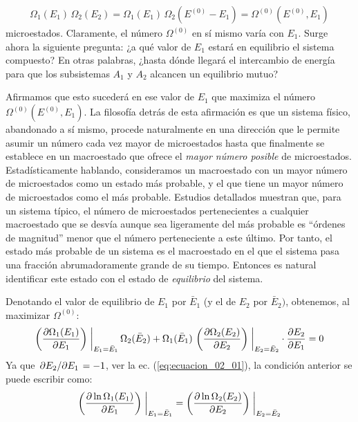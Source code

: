 \begin{align}
\Omega_{1} (E_{1}) \, \Omega_{2} (E_{2}) = \Omega_{1} (E_{1}) \, \Omega_{2} (E^{(0)} - E_{1}) = \Omega^{(0)} (E^{(0)}, E_{1})
\label{eq:ecuacion_02_02}
\end{align}
microestados. Claramente, el número $\Omega^{(0)}$ en sí mismo varía con $E_{1}$. Surge ahora la siguiente pregunta: ¿a qué valor de $E_{1}$ estará en equilibrio el sistema compuesto? En otras palabras, ¿hasta dónde llegará el intercambio de energía para que los subsistemas $A_{1}$ y $A_{2}$ alcancen un equilibrio mutuo?
\par
Afirmamos que esto sucederá en ese valor de $E_{1}$ que maximiza el número $\Omega^{(0)} (E^{(0)}, E_{1})$. La filosofía detrás de esta afirmación es que un sistema físico, abandonado a sí mismo, procede naturalmente en una dirección que le permite asumir un número cada vez mayor de microestados hasta que finalmente se establece en un macroestado que ofrece el \emph{mayor número posible} de microestados. Estadísticamente hablando, consideramos un macroestado con un mayor número de microestados como un estado más probable, y el que tiene un mayor número de microestados como el más probable. Estudios detallados muestran que, para un sistema típico, el número de microestados pertenecientes a cualquier macroestado que se desvía aunque sea ligeramente del más probable es \enquote{órdenes de magnitud} menor que el número perteneciente a este último. Por tanto, el estado más probable de un sistema es el macroestado en el que el sistema pasa una fracción abrumadoramente grande de su tiempo. Entonces es natural identificar este estado con el estado de \emph{equilibrio} del sistema.
\par
Denotando el valor de equilibrio de $E_{1}$ por $\bar{E}_{1}$ (y el de $E_{2}$ por $\bar{E}_{2})$, obtenemos, al maximizar $\Omega^{(0)}$:
\begin{align*}
\left( \pdv{\Omega_{1} (E_{1})}{E_{1}} \right) \eval_{E_{1} = \bar{E}_{1}} \, \Omega_{2} (\bar{E}_{2}) + \Omega_{1} (\bar{E}_{1}) \, \left( \pdv{\Omega_{2} (E_{2})}{E_{2}} \right) \eval_{E_{2} = \bar{E}_{2}} \cdot \pdv{E_{2}}{E_{1}} = 0
\end{align*}
Ya que $\pdv*{E_{2}}{E_{1}} = -1$, ver la ec. (\ref{eq:ecuacion_02_01}), la condición anterior se puede escribir como:
\begin{align*}
\left( \pdv{\ln \Omega_{1} (E_{1})}{E_{1}} \right) \eval_{E_{1} = \bar{E}_{1}} = \left( \pdv{\ln \Omega_{2} (E_{2})}{E_{2}} \right) \eval_{E_{2} = \bar{E}_{2}}
\end{align*}
